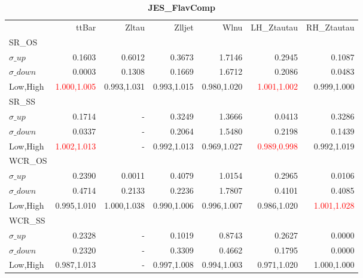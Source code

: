 \documentclass[11pt,oneside,a4paper]{article}
\begin{document}
\begin{table}
\caption{\bf{JES\_FlavComp}}
\centering
\begin{tabular}{lrrrrrr}
& ttBar & Zltau & Zlljet & Wlnu & LH\_Ztautau & RH\_Ztautau \\

SR\_OS &  &  &  &  &  &  \\
$\sigma\_up$ & 0.1603 & 0.6012 & 0.3673 & 1.7146 & 0.2945 & 0.1087 \\
$\sigma\_down$ & 0.0003 & 0.1308 & 0.1669 & 1.6712 & 0.2086 & 0.0483 \\
Low,High & \textcolor{red}{1.000,1.005} & 0.993,1.031 & 0.993,1.015 & 0.980,1.020 & \textcolor{red}{1.001,1.002} & 0.999,1.000 \\

\hline
SR\_SS &  &  &  &  &  &  \\
$\sigma\_up$ & 0.1714 & - & 0.3249 & 1.3666 & 0.0413 & 0.3286 \\
$\sigma\_down$ & 0.0337 & - & 0.2064 & 1.5480 & 0.2198 & 0.1439 \\
Low,High & \textcolor{red}{1.002,1.013} & - & 0.992,1.013 & 0.969,1.027 & \textcolor{red}{0.989,0.998} & 0.992,1.019 \\

\hline
WCR\_OS &  &  &  &  &  &  \\
$\sigma\_up$ & 0.2390 & 0.0011 & 0.4079 & 1.0154 & 0.2965 & 0.0106 \\
$\sigma\_down$ & 0.4714 & 0.2133 & 0.2236 & 1.7807 & 0.4101 & 0.4085 \\
Low,High & 0.995,1.010 & 1.000,1.038 & 0.990,1.006 & 0.996,1.007 & 0.986,1.020 & \textcolor{red}{1.001,1.028} \\

\hline
WCR\_SS &  &  &  &  &  &  \\
$\sigma\_up$ & 0.2328 & - & 0.1019 & 0.8743 & 0.2627 & 0.0000 \\
$\sigma\_down$ & 0.2320 & - & 0.3309 & 0.4662 & 0.1795 & 0.0000 \\
Low,High & 0.987,1.013 & - & 0.997,1.008 & 0.994,1.003 & 0.971,1.020 & 1.000,1.000 \\

\end{tabular}
\end{table}
\end{document}
